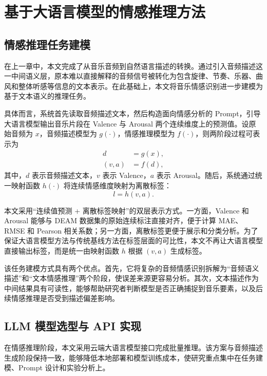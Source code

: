 \newpage

\section{基于大语言模型的情感推理方法}

\subsection{情感推理任务建模}

在上一章中，本文完成了从音乐音频到自然语言描述的转换。通过引入音频描述这一中间语义层，原本难以直接解释的音频信号被转化为包含旋律、节奏、乐器、曲风和整体听感等信息的文本表示。在此基础上，本文将音乐情感识别进一步建模为基于文本语义的推理任务。

具体而言，系统首先读取音频描述文本，然后构造面向情感分析的 Prompt，引导大语言模型输出音乐片段在 Valence 与 Arousal 两个连续维度上的预测值。设原始音频为 $x$，音频描述模型为 $g(\cdot)$，情感推理模型为 $f(\cdot)$，则两阶段过程可表示为
\begin{equation}
\begin{aligned}
d &= g(x), \\
(v,a) &= f(d),
\end{aligned}
\end{equation}
其中，$d$ 表示音频描述文本，$v$ 表示 Valence，$a$ 表示 Arousal。随后，系统通过统一映射函数 $h(\cdot)$ 将连续情感维度映射为离散标签：
\begin{equation}
l=h(v,a).
\end{equation}

本文采用“连续值预测 + 离散标签映射”的双层表示方式。一方面，Valence 和 Arousal 能够与 DEAM 数据集的原始连续标注直接对齐，便于计算 MAE、RMSE 和 Pearson 相关系数；另一方面，离散标签更便于展示和分类分析。为了保证大语言模型方法与传统基线方法在标签层面的可比性，本文不再让大语言模型直接输出标签，而是统一由映射函数 $h$ 根据 $(v,a)$ 生成标签。

该任务建模方式具有两个优点。首先，它将复杂的音频情感识别拆解为“音频语义描述”和“文本情感推理”两个阶段，使误差来源更容易分析。其次，文本描述作为中间结果具有可读性，能够帮助研究者判断模型是否正确捕捉到音乐要素，以及后续情感推理是否受到描述偏差影响。

\subsection{LLM 模型选型与 API 实现}

在情感推理阶段，本文采用云端大语言模型接口完成批量推理。该方案与音频描述生成阶段保持一致，能够降低本地部署和模型训练成本，使研究重点集中在任务建模、Prompt 设计和实验分析上。

